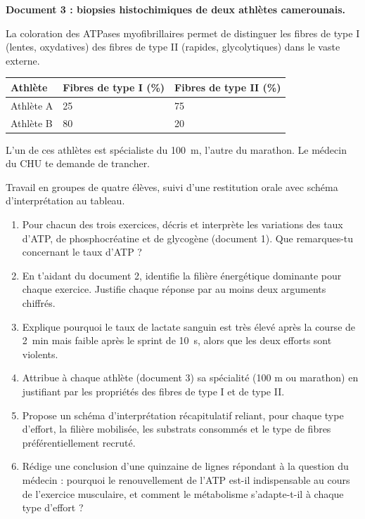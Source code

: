 \documentclass[11pt]{article}
\newcounter{popsec}
\newcounter{popsub}
\newcommand{\courssub}[1]{%
  \stepcounter{popsub}%
  \par\vspace{9pt}\noindent{\popxbold\fontsize{11.5}{13}\selectfont\color{popink}{\color{poporange}\thepopsec.\thepopsub}\hspace{6pt}#1}\par\nopagebreak\vspace{4pt}
}
\begin{document}
\textbf{Document 3 : biopsies histochimiques de deux athlètes camerounais.}

La coloration des ATPases myofibrillaires permet de distinguer les fibres de type I (lentes, oxydatives) des fibres de type II (rapides, glycolytiques) dans le vaste externe.

\begin{center}
\begin{tabularx}{\linewidth}{|l|X|X|}
\hline
\rowcolor{popblueL} \textbf{Athlète} & \textbf{Fibres de type I (\%)} & \textbf{Fibres de type II (\%)} \\
\hline
Athlète A & 25 & 75 \\
\hline
Athlète B & 80 & 20 \\
\hline
\end{tabularx}
\end{center}

L'un de ces athlètes est spécialiste du \SI{100}{m}, l'autre du marathon. Le médecin du CHU te demande de trancher.

\courssub{Consignes}

Travail en groupes de quatre élèves, suivi d'une restitution orale avec schéma d'interprétation au tableau.

\begin{enumerate}
\item Pour chacun des trois exercices, décris et interprète les variations des taux d'ATP, de phosphocréatine et de glycogène (document 1). Que remarques-tu concernant le taux d'ATP ?
\item En t'aidant du document 2, identifie la filière énergétique dominante pour chaque exercice. Justifie chaque réponse par au moins deux arguments chiffrés.
\item Explique pourquoi le taux de lactate sanguin est très élevé après la course de \SI{2}{min} mais faible après le sprint de \SI{10}{s}, alors que les deux efforts sont violents.
\item Attribue à chaque athlète (document 3) sa spécialité (100 m ou marathon) en justifiant par les propriétés des fibres de type I et de type II.
\item Propose un schéma d'interprétation récapitulatif reliant, pour chaque type d'effort, la filière mobilisée, les substrats consommés et le type de fibres préférentiellement recruté.
\item Rédige une conclusion d'une quinzaine de lignes répondant à la question du médecin : pourquoi le renouvellement de l'ATP est-il indispensable au cours de l'exercice musculaire, et comment le métabolisme s'adapte-t-il à chaque type d'effort ?
\end{enumerate}
\end{document}
